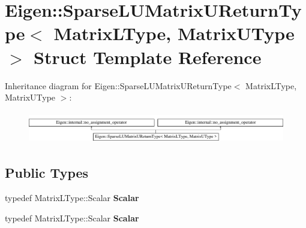 \hypertarget{struct_eigen_1_1_sparse_l_u_matrix_u_return_type}{}\section{Eigen\+:\+:Sparse\+L\+U\+Matrix\+U\+Return\+Type$<$ Matrix\+L\+Type, Matrix\+U\+Type $>$ Struct Template Reference}
\label{struct_eigen_1_1_sparse_l_u_matrix_u_return_type}
Inheritance diagram for Eigen\+:\+:Sparse\+L\+U\+Matrix\+U\+Return\+Type$<$ Matrix\+L\+Type, Matrix\+U\+Type $>$\+:\begin{figure}[H]
\begin{center}
\leavevmode
\includegraphics[height=1.417722cm]{struct_eigen_1_1_sparse_l_u_matrix_u_return_type}
\end{center}
\end{figure}
\subsection*{Public Types}
\begin{DoxyCompactItemize}
\item 
\mbox{\label{struct_eigen_1_1_sparse_l_u_matrix_u_return_type_add90da2111178ef9261c229bb6c788c0}} 
typedef Matrix\+L\+Type\+::\+Scalar {\bfseries Scalar}
\item 
\mbox{\label{struct_eigen_1_1_sparse_l_u_matrix_u_return_type_add90da2111178ef9261c229bb6c788c0}} 
typedef Matrix\+L\+Type\+::\+Scalar {\bfseries Scalar}
\end{DoxyCompactItemize}
